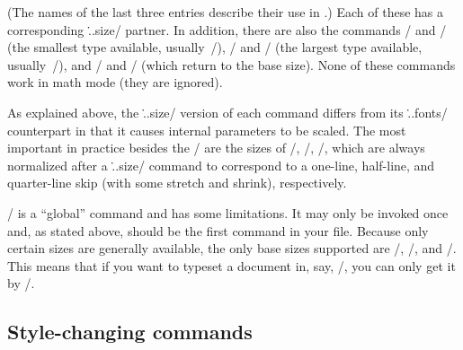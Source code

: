 \smallskip

\noindent (The names of the last three entries describe their use in \jyTeX.)
Each of these has a corresponding \tts\...size/ partner.  In addition, there
are also the commands \tts\tinyfonts/ and \tts\tinysize/ (the smallest type
available, usually~/), \tts\HUGEFONTS/ and \tts\HUGESIZE/ (the largest
type available, usually~/), and \tts\normalfonts/ and \tts\normalsize/
(which return \jyTeX{} to the base size). None of these commands work in math
mode (they are ignored).

As explained above, the \tts\...size/ version of each command differs from its
\tts\...fonts/ counterpart in that it causes internal parameters to be scaled.
The most important in practice besides the \tts\baselineskip/ are the sizes of
\tts\bigskip/, \tts\medskip/, \tts\smallskip/, which are always normalized
after a \tts\...size/ command to correspond to a one-line, half-line, and
quarter-line skip (with some stretch and shrink), respectively.

\tts\typesize/ is a ``global'' command and has some limitations. It may
only be invoked once and, as stated above, should be the first command in
your file. Because only certain sizes are generally available, the only
base sizes supported are /, /, and /. This means
that if you want to typeset a document in, say, /, you can only get
it by \tts\typesize=12pt \smallsize/.

{\sl\subsection{Style-changing commands}}

